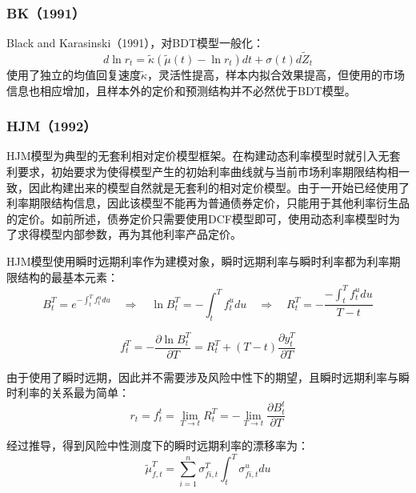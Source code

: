 \documentclass[11pt]{article}
\begin{document}
\subsubsection{BK（1991）}

Black and Karasinski（1991），对BDT模型一般化：
\begin{equation*}
	d\ln r_t = \tilde{\kappa}\left(\tilde{\mu}(t) - \ln r_t \right) dt + \sigma(t)d\tilde{Z}_t
\end{equation*}
使用了独立的均值回复速度$\tilde{\kappa}$，灵活性提高，样本内拟合效果提高，但使用的市场信息也相应增加，且样本外的定价和预测结构并不必然优于BDT模型。

\subsubsection{HJM（1992）}

HJM模型为典型的无套利相对定价模型框架。在构建动态利率模型时就引入无套利要求，初始要求为使得模型产生的初始利率曲线就与当前市场利率期限结构相一致，因此构建出来的模型自然就是无套利的相对定价模型。由于一开始已经使用了利率期限结构信息，因此该模型不能再为普通债券定价，只能用于其他利率衍生品的定价。如前所述，债券定价只需要使用DCF模型即可，使用动态利率模型时为了求得模型内部参数，再为其他利率产品定价。

HJM模型使用瞬时远期利率作为建模对象，瞬时远期利率与瞬时利率都为利率期限结构的最基本元素：
\begin{equation*}
	B^T_t = e^{-\int^T_t f^u_t du} \quad\Rightarrow\quad 
	\ln B^T_t = - \int^T_t f^u_t du \quad\Rightarrow\quad
	R^T_t = - \frac{-\int^T_t f^u_t du}{T-t}
\end{equation*}

\begin{equation*}
	f^T_t = -\frac{\partial \ln B^T_t}{\partial T} = R^T_t + (T-t)\frac{\partial y^T_t}{\partial T}
\end{equation*}

由于使用了瞬时远期，因此并不需要涉及风险中性下的期望，且瞬时远期利率与瞬时利率的关系最为简单：
\begin{equation*}
	r_t = f^t_t = \lim_{T\rightarrow t} R^T_t = -\lim_{T\rightarrow t} \frac{\partial B^t_t}{\partial T}
\end{equation*}

经过推导，得到风险中性测度下的瞬时远期利率的漂移率为：
\begin{equation*}
	\tilde{\mu}^T_{f,t} = \sum^n_{i=1} \sigma^T_{fi,t} \int^T_t \sigma^u_{fi,t} du
\end{equation*}
\end{document}
